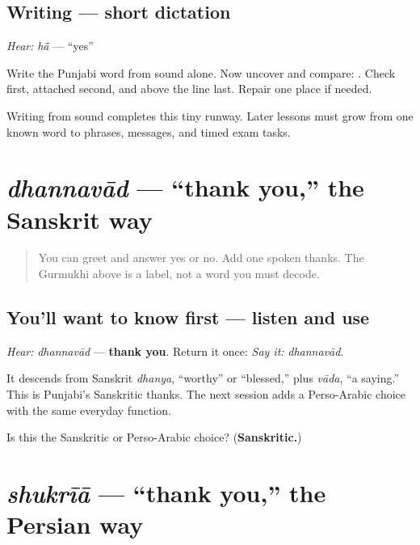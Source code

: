 \subsection*{Writing — short dictation}
\emph{Hear:} \emph{hā̃} — “yes”

Write the Punjabi word from sound alone. Now uncover and compare: \textbf{}. Check \textbf{} first, attached \textbf{} second, and \textbf{} above the line last. Repair one place if needed.

\begin{tcolorbox}[breakable,colback=teal!4,colframe=teal!35!black,title={Before you move on}]
Writing from sound completes this tiny runway. Later lessons must grow from one known word to phrases, messages, and timed exam tasks.
\end{tcolorbox}
\section[\texorpdfstring{\pa{ਧੰਨਵਾਦ} (dhannavād)}{ਧੰਨਵਾਦ (dhannavād)}]{\emph{dhannavād} — “thank you,” the Sanskrit way}

\label{lesson:PA-C01-dhanvaad}



\begin{quote}
You can greet and answer yes or no. Add one spoken thanks. The Gurmukhi above is a label, not a word you must decode.
\end{quote}

\subsection*{You'll want to know first — listen and use}
\emph{Hear:} \emph{dhannavād} — \textbf{thank you}. Return it once: \emph{Say it:} \emph{dhannavād}.

It descends from Sanskrit \emph{dhanya}, “worthy” or “blessed,” plus \emph{vāda}, “a saying.” This is Punjabi’s Sanskritic thanks. The next session adds a Perso-Arabic choice with the same everyday function.

\begin{tcolorbox}[breakable,colback=teal!4,colframe=teal!35!black,title={Before you move on}]
Is this the Sanskritic or Perso-Arabic choice? (\textbf{Sanskritic.})
\end{tcolorbox}
\section[\texorpdfstring{\pa{ਸ਼ੁਕਰੀਆ} (shukrīā)}{ਸ਼ੁਕਰੀਆ (shukrīā)}]{\emph{shukrīā} — “thank you,” the Persian way}

